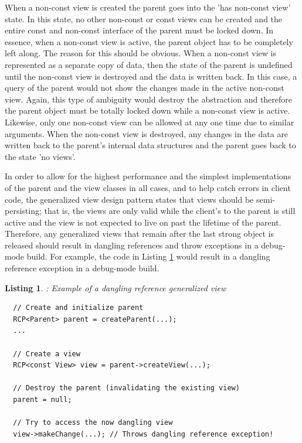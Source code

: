 \documentclass[pdf,ps2pdf,11pt]{SANDreport}
\newtheorem{listing}{Listing}
\begin{document}
When a non-const view is created the parent goes into the 'has
non-const view' state.  In this state, no other non-const or const
views can be created and the entire const and non-const interface of
the parent must be locked down.  In essence, when a non-const view is
active, the parent object has to be completely left along.  The reason
for this should be obvious.  When a non-const view is represented as a
separate copy of data, then the state of the parent is undefined until
the non-const view is destroyed and the data is written back.  In this
case, a query of the parent would not show the changes made in the
active non-const view.  Again, this type of ambiguity would destroy
the abstraction and therefore the parent object must be totally locked
down while a non-const view is active.  Likewise, only one non-const
view can be allowed at any one time due to similar arguments.  When
the non-const view is destroyed, any changes in the data are written
back to the parent's internal data structures and the parent goes back
to the state 'no views'.

In order to allow for the highest performance and the simplest
implementations of the parent and the view classes in all cases, and
to help catch errors in client code, the generalized view design
pattern states that views should be semi-persisting; that is, the
views are only valid while the client's {} to the parent
is still active and the view is not expected to live on past the
lifetime of the parent.  Therefore, any generalized views that remain
after the last strong {} object is released should
result in dangling references and throw exceptions in a debug-mode
build.  For example, the code in Listing
{}\ref{listing:generalized-view-dangling} would result in a dangling
reference exception in a debug-mode build.


\begin{listing}:  Example of a dangling reference generalized view  \\
\label{listing:generalized-view-dangling}
{\small\begin{verbatim}
  // Create and initialize parent
  RCP<Parent> parent = createParent(...);
  ...

  // Create a view
  RCP<const View> view = parent->createView(...);

  // Destroy the parent (invalidating the existing view)
  parent = null;

  // Try to access the now dangling view
  view->makeChange(...); // Throws dangling reference exception!
\end{verbatim}}
\end{listing}
\end{document}
